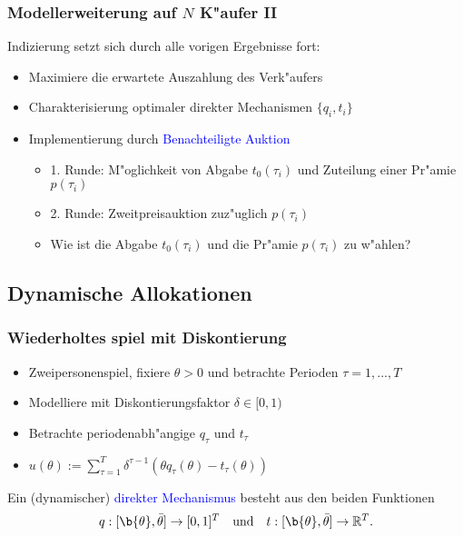 \begin{frame}
\frametitle{Modellerweiterung auf $N$ K"aufer II}
\justifying
Indizierung setzt sich durch alle vorigen Ergebnisse fort:
\begin{itemize}
  \item Maximiere die erwartete Auszahlung des Verk"aufers
  \item Charakterisierung optimaler direkter Mechanismen $\{ q_{i}, t_{i}\}$
  \item Implementierung durch \textcolor{blue}{Benachteiligte Auktion}
  \begin{itemize}
    \item 1. Runde: M"oglichkeit von Abgabe $t_{0}(\tau_{i})$ und Zuteilung einer Pr"amie $p(\tau_{i})$
    \item 2. Runde: Zweitpreisauktion zuz"uglich $p(\tau_{i})$
    \item Wie ist die Abgabe $t_{0}(\tau_{i})$ und die Pr"amie $p(\tau_{i})$ zu w"ahlen?
  \end{itemize}
\end{itemize}
\end{frame}

\subsection{Dynamische Allokationen}
\begin{frame}
\frametitle{Wiederholtes spiel mit Diskontierung}
\justifying
\begin{itemize}
  \item Zweipersonenspiel, fixiere $\theta > 0$ und betrachte Perioden $\tau = 1,...,T$
  \item Modelliere mit Diskontierungsfaktor $\delta \in [0,1)$
  \item Betrachte periodenabh"angige $q_{\tau}$ und $t_{\tau}$
  \item $u(\theta) := \sum_{\tau=1}^{T} \delta^{\tau -1} (\theta q_\tau(\theta) - t_\tau(\theta))$
\end{itemize}

\begin{thmD}
  Ein (dynamischer) \textcolor{blue}{direkter Mechanismus} besteht aus den beiden Funktionen
  \begin{equation*}
    q:[ \b{\theta} , \bar{\theta} ] \rightarrow [0,1]^{T}
    \quad \text{und} \quad
    t:[ \b{\theta} , \bar{\theta} ] \rightarrow \mathbb{R}^{T}.
  \end{equation*}
\end{thmD}

\end{frame}

